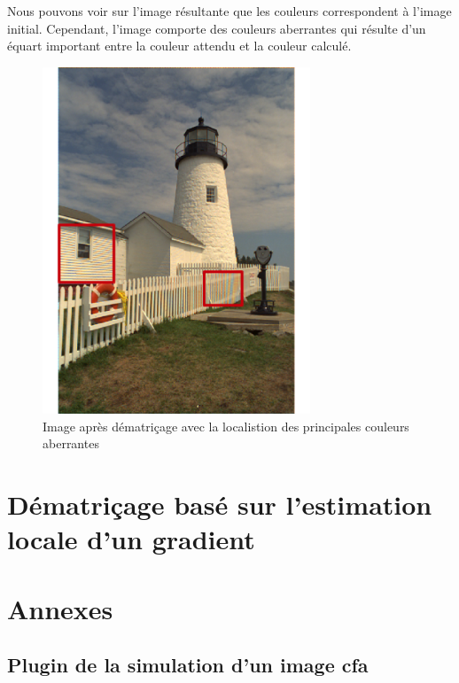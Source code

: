 \documentclass[a4paper,11pt]{article}
\begin{document}
   Nous pouvons voir sur l'image résultante que les couleurs correspondent à l'image initial. Cependant,
   l'image comporte des couleurs aberrantes qui résulte d'un équart important entre la couleur attendu
   et la couleur calculé.

  \begin{figure}[H]
  \center
   \includegraphics[width=8cm]{../result2ROI.png}
   \caption{Image après dématriçage avec la localistion des principales couleurs aberrantes}
  \end{figure}
   
  \section{Dématriçage basé sur l'estimation locale d'un gradient}
  
  \newpage
 
  \section{Annexes}
  
  \subsection{Plugin de la simulation d'un image cfa}
  
\end{document}
